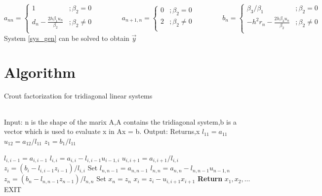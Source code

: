 \documentclass[12pt]{article}
\begin{document}
		\begin{equation}\label{edges2}
		a_{nn} = \left\{ \begin{array}{cr}
			1 &; \beta_2 = 0 \\[3mm]
			\displaystyle d_n - \frac{2h \beta_1 u_n}{\beta_2} &; \beta_2 \neq 0 \\
		\end{array} \right.
		\qquad\qquad
		a_{n+1,n} = \left\{ \begin{array}{cr}
			0 &; \beta_2 = 0 \\[3mm]
			2 &; \beta_2 \neq 0 \\
		\end{array} \right.
		\qquad\qquad
		b_n = \left\{ \begin{array}{cr}
			\beta_3/\beta_1 &; \beta_2 = 0 \\[3mm]
			\displaystyle -h^2r_n - \frac{2h \beta_3 u_n}{\beta_2} &; \beta_2 \neq 0 \\
		\end{array} \right.
	\end{equation}
	System \ref{sys_gen} can be solved to obtain $ \vec{y} $
	\newpage
	\section{Algorithm}
	\begin{algorithm}[H]
		\centering
		\caption{Crout factorization for tridiagonal linear systems}
		\begin{algorithmic}
			 \hline \\
			\State Input: n is the shape of the marix A,A contains the tridiagonal system,b is a vector which is used to evaluate x in Ax = b.
			\State Output: Returns,x
			\hline
			\State $l_{11} = a_{11}$
			\State $u_{12} = a_{12}/l_{11}$ 
			\State $z_{1} = b_{1}/l_{11}$
			
			\State ${\displaystyle l_{i,i-1} = a_{i,i-1}}$
			\State ${\displaystyle l_{i,i} = a_{i,i} - l_{i,i-1}u_{i-1,i}}$
			\State ${\displaystyle u_{i,i+1} = a_{i,i+1}/l_{i,i}}$
			\State ${\displaystyle z_{i} = (b_{i} - l_{i,i-1}z_{i-1})/l_{i,i} }$
			\EndFor
			\State Set
			\State ${\displaystyle l_{n,n-1} = a_{n,n-1}}$
			\State ${\displaystyle l_{n,n} = a_{n,n} - l_{n,n-1}u_{n-1,n}}$
			\State ${\displaystyle z_{n} = (b_{n} - l_{n,n-1}z_{n-1})/l_{n,n} }$
			\State Set $x_{n} = z_{n}$
			\State ${\displaystyle x_{i} = z_{i} - u_{i,i+1}x_{i+1}}$
			\EndFor
			\State \textbf{Return} $x_{1},x_{2},\dots$
			\State EXIT
			\EndProcedure
		\end{algorithmic} 
	\end{algorithm}
\end{document}
